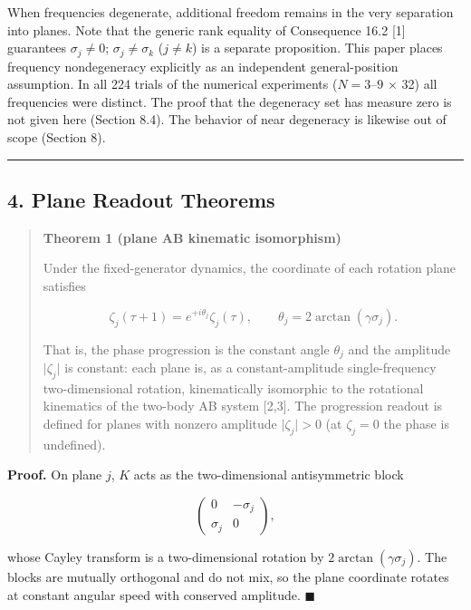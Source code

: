 \documentclass[
  a4paper,
]{article}
\begin{document}
When frequencies degenerate, additional freedom remains in the very
separation into planes. Note that the generic rank equality of
Consequence 16.2 {[}1{]} guarantees \(\sigma_j\ne0\);
\(\sigma_j\ne\sigma_k\) (\(j\ne k\)) is a separate proposition. This
paper places frequency nondegeneracy explicitly as an independent
general-position assumption. In all 224 trials of the numerical
experiments (\(N=3\)--\(9\) × 32) all frequencies were distinct. The
proof that the degeneracy set has measure zero is not given here
(Section 8.4). The behavior of near degeneracy is likewise out of scope
(Section 8).

\begin{center}\rule{0.5\linewidth}{0.5pt}\end{center}

\subsection{4. Plane Readout Theorems}\label{plane-readout-theorems}

\begin{quote}
\textbf{Theorem 1 (plane AB kinematic isomorphism)}

Under the fixed-generator dynamics, the coordinate of each rotation
plane satisfies

\[
\zeta_j(\tau+1)=e^{+i\theta_j}\zeta_j(\tau),
\qquad
\theta_j=2\arctan(\gamma\sigma_j).
\]

That is, the phase progression is the constant angle \(\theta_j\) and
the amplitude \(\lvert\zeta_j\rvert\) is constant: each plane is, as a
constant-amplitude single-frequency two-dimensional rotation,
kinematically isomorphic to the rotational kinematics of the two-body AB
system {[}2,3{]}. The progression readout is defined for planes with
nonzero amplitude \(\lvert\zeta_j\rvert>0\) (at \(\zeta_j=0\) the phase
is undefined).
\end{quote}

\textbf{Proof.} On plane \(j\), \(K\) acts as the two-dimensional
antisymmetric block

\[
\begin{pmatrix}0&-\sigma_j\\\sigma_j&0\end{pmatrix},
\]

whose Cayley transform is a two-dimensional rotation by
\(2\arctan(\gamma\sigma_j)\). The blocks are mutually orthogonal and do
not mix, so the plane coordinate rotates at constant angular speed with
conserved amplitude. \(\blacksquare\)
\end{document}
